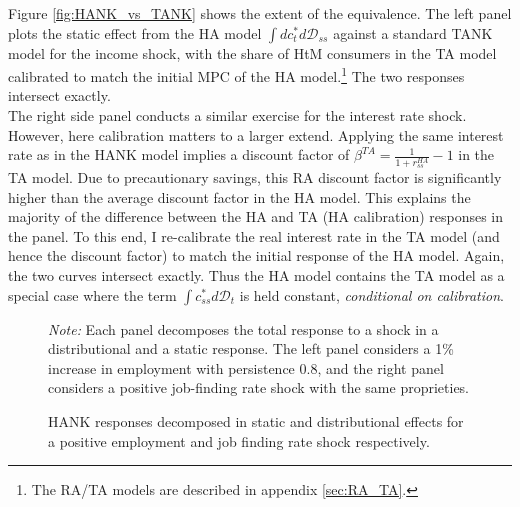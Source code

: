 Figure \ref{fig:HANK_vs_TANK} shows the extent of the equivalence. The left panel plots the static effect from the HA model $\int dc_{t}^{*}d\mathcal{D}_{ss}$ against a standard TANK model for the income shock, with the share of HtM consumers in the TA model calibrated to match the initial MPC of the HA model.\footnote{The RA/TA models are described in appendix \ref{sec:RA_TA}.} The two responses intersect exactly. \\
The right side panel conducts a similar exercise for the interest rate shock. However, here calibration matters to a larger extend. Applying the same interest rate as in the HANK model implies a discount factor of $\beta^{TA}=\frac{1}{1+r_{ss}^{HA}}-1$ in the TA model. Due to precautionary savings, this RA discount factor is significantly higher than the average discount factor in the HA model. This explains the majority of the difference between the HA and TA (HA calibration) responses in the panel. To this end, I re-calibrate the real interest rate in the TA model (and hence the discount factor) to match the initial response of the HA model. Again, the two curves intersect exactly. Thus the HA model contains the TA model as a special case where the term ${\int c_{ss}^{*}d\mathcal{D}_{t}}$ is held constant, \textit{conditional on calibration}.





\begin{figure}[h]
\caption{HANK responses decomposed in static and distributional effects for a positive employment and job finding rate shock respectively. }
\label{fig:C_decomp_over_dist_N_q}
\centering
    \scriptsize
    {
    \emph{Note:} Each panel decomposes the total response to a shock in a distributional and a static response. The left panel considers a 1\% increase in employment with persistence 0.8, and the right panel considers a positive job-finding rate shock with the same proprieties.}
\end{figure}

